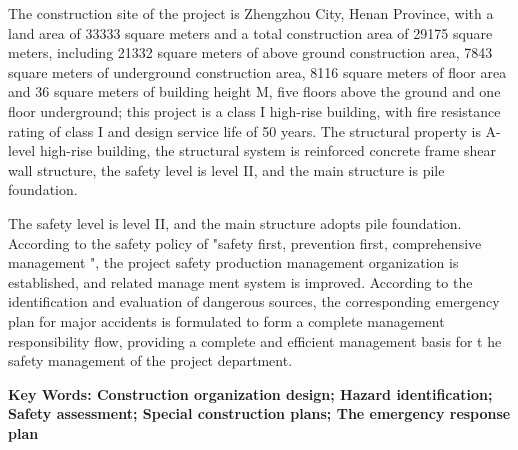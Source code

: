     The construction site of the project is Zhengzhou City, Henan Province, with a land area of 33333 square meters and a total construction area of 29175 square meters, 
    including 21332 square meters of above ground construction area, 7843 square meters of underground construction area, 8116 square meters of floor area and 36 square 
    meters of building height M, five floors above the ground and one floor underground; this project is a class I high-rise building, with fire resistance rating of 
    class I and design service life of 50 years. The structural property is A-level high-rise building, the structural system is reinforced concrete frame shear wall 
    structure, the safety level is level II, and the main structure is pile foundation.
    
    The safety level is level II, and the main structure adopts pile foundation.
   According to the safety policy of "safety first, prevention first, comprehensive management ", the project safety production management 
   organization is established, and related manage ment system is improved. According to the identification and evaluation of dangerous sources,
    the corresponding emergency plan for major accidents is formulated to form a complete management responsibility flow, providing a complete 
    and efficient management basis for t he safety management of the project department.


\textbf{ Key Words: Construction organization design; Hazard identification; Safety assessment; Special construction plans; The emergency response plan}
\pagestyle{fancy}



